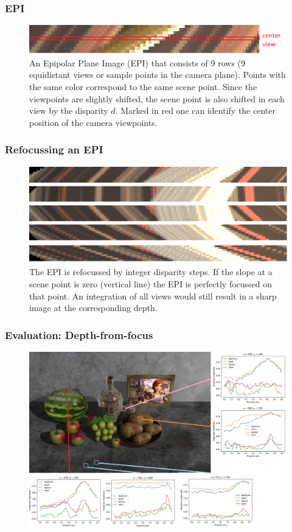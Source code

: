 \documentclass[11pt]{beamer}
\begin{document}
\begin{frame}
	\frametitle{EPI}
	\begin{figure}
		\centering
		\includegraphics[width=1\linewidth]{images/simple_epi}
		\caption[Example Epipolar Plane image]{An Epipolar Plane Image (EPI) that consists of 9 rows (9 equidistant views or sample points in the camera plane). Points with the same color correspond to the same scene point. Since the viewpoints are slightly shifted, the scene point is also shifted in each view by the disparity $d$. Marked in red one can identify the center position of the camera viewpoints.}
		\label{fig:simpleepi}
	\end{figure}
\end{frame}
\begin{frame}
\frametitle{Refocussing an EPI}
\begin{figure}
	\centering
	\includegraphics[width=0.7\linewidth]{images/refocused_cut}
	\caption[Refocussed EPI]{The EPI is refocussed by integer disparity steps. If the slope at a scene point is zero (vertical line) the EPI is perfectly focussed on that point. An integration of all views would still result in a sharp image at the corresponding depth.}
	\label{fig:refocusedcut}
\end{figure}
\end{frame}

\begin{frame}
\frametitle{Evaluation: Depth-from-focus}
\begin{figure}
	\centering
	\includegraphics[width=1\linewidth]{images/original_marked}
	\label{fig:originalmarked}
\end{figure}
\end{frame}
\end{document}
